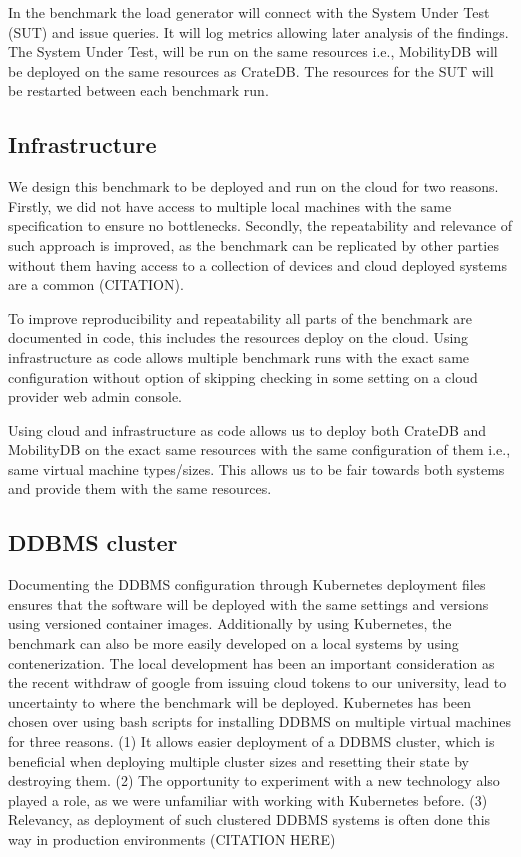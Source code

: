 In the benchmark the load generator will connect with the System Under Test (SUT) and issue queries.
It will log metrics allowing later analysis of the findings.
The System Under Test, will be run on the same resources i.e., MobilityDB will be deployed on the same resources as CrateDB.
The resources for the SUT will be restarted between each benchmark run.

\subsection{Infrastructure}
We design this benchmark to be deployed and run on the cloud for two reasons.
Firstly, we did not have access to multiple local machines with the same specification to ensure no bottlenecks.
Secondly, the repeatability and relevance of such approach is improved, as the benchmark can be replicated by other parties without them having access to a collection of devices and cloud deployed systems are a common (CITATION).

To improve reproducibility and repeatability all parts of the benchmark are documented in code, this includes the resources deploy on the cloud.
Using infrastructure as code allows multiple benchmark runs with the exact same configuration without option of skipping checking in some setting on a cloud provider web admin console.

Using cloud and infrastructure as code allows us to deploy both CrateDB and MobilityDB on the exact same resources with the same configuration of them i.e., same virtual machine types/sizes.
This allows us to be fair towards both systems and provide them with the same resources.

\subsection{DDBMS cluster}
Documenting the DDBMS configuration through Kubernetes deployment files ensures that the software will be deployed with the same settings and versions using versioned container images.
Additionally by using Kubernetes, the benchmark can also be more easily developed on a local systems by using contenerization.
The local development has been an important consideration as the recent withdraw of google from issuing cloud tokens to our university, lead to uncertainty to where the benchmark will be deployed.
Kubernetes has been chosen over using bash scripts for installing DDBMS on multiple virtual machines for three reasons.
(1) It allows easier deployment of a DDBMS cluster, which is beneficial when deploying multiple cluster sizes and resetting their state by destroying them.
(2) The opportunity to experiment with a new technology also played a role, as we were unfamiliar with working with Kubernetes before.
(3) Relevancy, as deployment of such clustered DDBMS systems is often done this way in production environments (CITATION HERE)


